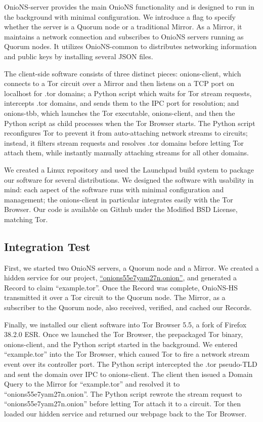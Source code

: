 \documentclass[USenglish,oneside,twocolumn]{article}
\begin{document}
OnioNS-server provides the main OnioNS functionality and is designed to run in the background with minimal configuration. We introduce a flag to specify whether the server is a Quorum node or a traditional Mirror. As a Mirror, it maintains a network connection and subscribes to OnioNS servers running as Quorum nodes. It utilizes OnioNS-common to distributes networking information and public keys by installing several JSON files.

The client-side software consists of three distinct pieces: onions-client, which connects to a Tor circuit over a Mirror and then listens on a TCP port on localhost for .tor domains; a Python script which waits for Tor stream requests, intercepts .tor domains, and sends them to the IPC port for resolution; and onions-tbb, which launches the Tor executable, onions-client, and then the Python script as child processes when the Tor Browser starts. The Python script reconfigures Tor to prevent it from auto-attaching network streams to circuits; instead, it filters stream requests and resolves .tor domains before letting Tor attach them, while instantly manually attaching streams for all other domains.

We created a Linux repository and used the Launchpad build system to package our software for several distributions. We designed the software with usability in mind: each aspect of the software runs with minimal configuration and management; the onions-client in particular integrates easily with the Tor Browser. Our code is available on Github under the Modified BSD License, matching Tor.

\subsection{Integration Test}

First, we started two OnioNS servers, a Quorum node and a Mirror. We created a hidden service for our project, \href{http://onions55e7yam27n.onion}{``onions55e7yam27n.onion''}, and generated a Record to claim ``example.tor''. Once the Record was complete, OnioNS-HS transmitted it over a Tor circuit to the Quorum node. The Mirror, as a subscriber to the Quorum node, also received, verified, and cached our Records.

Finally, we installed our client software into Tor Browser 5.5, a fork of Firefox 38.2.0 ESR. Once we launched the Tor Browser, the prepackaged Tor binary, onions-client, and the Python script started in the background. We entered ``example.tor'' into the Tor Browser, which caused Tor to fire a network stream event over its controller port. The Python script intercepted the .tor pseudo-TLD and sent the domain over IPC to onions-client. The client then issued a Domain Query to the Mirror for ``example.tor'' and resolved it to ``onions55e7yam27n.onion''. The Python script rewrote the stream request to ``onions55e7yam27n.onion'' before letting Tor attach it to a circuit. Tor then loaded our hidden service and returned our webpage back to the Tor Browser.
\end{document}
